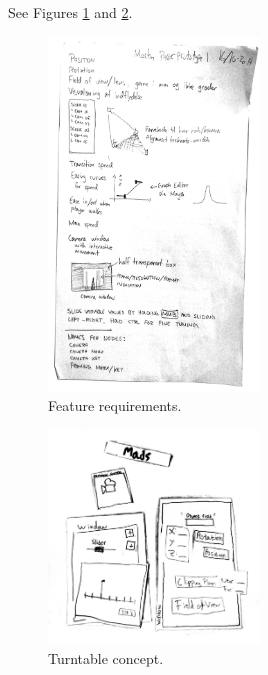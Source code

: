 See Figures \ref{fig:morten_requirements} and \ref{fig:mads_turntable}.

\begin{figure}[htbp]
\centering
\includegraphics[width=0.50\textwidth]{Pics/Morten01}
\caption{Feature requirements.}
\label{fig:morten_requirements}
\end{figure}

\begin{figure}[htbp]
\centering
\includegraphics[width=0.50\textwidth]{Pics/Mads01}
\caption{Turntable concept.}
\label{fig:mads_turntable}
\end{figure}

